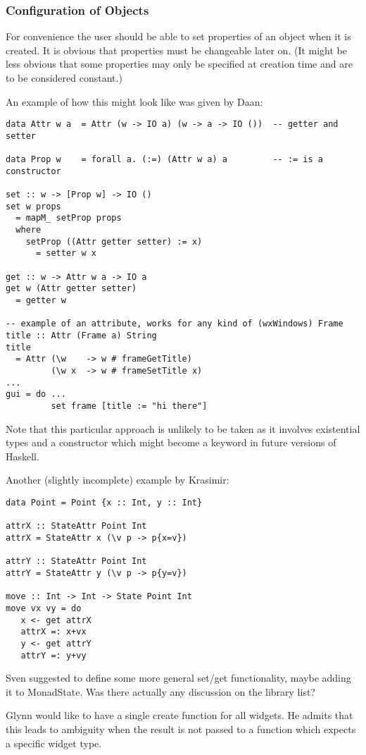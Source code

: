 \documentclass{article}
\begin{document}
\subsubsection{Configuration of Objects}
For convenience the user should be able to set properties of an object
when it is created. It is obvious that properties must be changeable
later on.  (It might be less obvious that some properties may
only be specified at creation time and are to be considered constant.)

An example of how this might look like was given by Daan:
\begin{verbatim}
data Attr w a  = Attr (w -> IO a) (w -> a -> IO ())  -- getter and setter

data Prop w    = forall a. (:=) (Attr w a) a         -- := is a constructor

set :: w -> [Prop w] -> IO ()
set w props
  = mapM_ setProp props
  where
    setProp ((Attr getter setter) := x)
      = setter w x

get :: w -> Attr w a -> IO a
get w (Attr getter setter)
  = getter w

-- example of an attribute, works for any kind of (wxWindows) Frame
title :: Attr (Frame a) String
title
  = Attr (\w    -> w # frameGetTitle)
         (\w x  -> w # frameSetTitle x)
...
gui = do ...
         set frame [title := "hi there"]

\end{verbatim}
Note that this particular approach is unlikely to be taken as it
involves existential types and a constructor which might become a
keyword in future versions of Haskell.

Another (slightly incomplete) example by Krasimir:
\begin{verbatim}
data Point = Point {x :: Int, y :: Int}

attrX :: StateAttr Point Int
attrX = StateAttr x (\v p -> p{x=v})

attrY :: StateAttr Point Int
attrY = StateAttr y (\v p -> p{y=v})

move :: Int -> Int -> State Point Int
move vx vy = do
   x <- get attrX
   attrX =: x+vx
   y <- get attrY
   attrY =: y+vy
\end{verbatim}

Sven suggested to define some more general set/get functionality,
maybe adding it to MonadState. Was there actually any discussion on
the library list?

Glynn would like to have a single create function for all widgets. He
admits that this leads to ambiguity when the result is not passed to a
function which expects a specific widget type.
\end{document}
